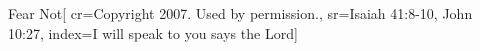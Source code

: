 {Fear Not}[
    cr={Copyright 2007.  Used by permission.},
    sr={Isaiah 41:8-10, John 10:27},
    index={I will speak to you says the Lord}]
